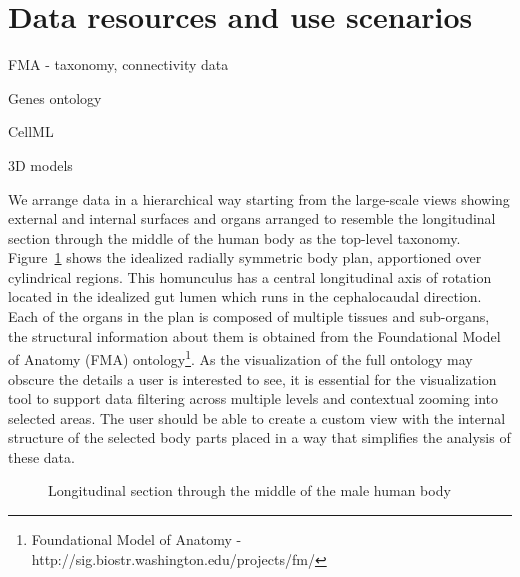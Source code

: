 \section{Data resources and use scenarios}
\label{sect:motivation}

FMA - taxonomy, connectivity data

Genes ontology

CellML

3D models


We arrange data in a hierarchical way starting from the large-scale views showing external and internal surfaces and organs
arranged to resemble the longitudinal section through the middle of the human body as the top-level taxonomy.
Figure~\ref{fig:application} shows the idealized radially symmetric body plan, apportioned over cylindrical regions.
This homunculus has a central longitudinal axis of rotation located in the idealized gut lumen which runs in the cephalocaudal direction.
Each of the organs in the plan is composed of multiple tissues and sub-organs, the structural information about them is obtained from the Foundational Model of Anatomy (FMA) ontology\footnote{Foundational Model of Anatomy -
\textsf{http://sig.biostr.washington.edu/projects/fm/}}. As the visualization of the full ontology may obscure the details a user is interested to see, it is essential for the visualization tool to support data filtering across multiple levels and contextual zooming into selected areas. The user should be able to create a custom view with the internal structure of the selected body parts placed in a way that simplifies the analysis of these data.

\begin{figure}
\centering
  \caption{Longitudinal section through the middle of the male human body}
  \label{fig:application}
\end{figure}

